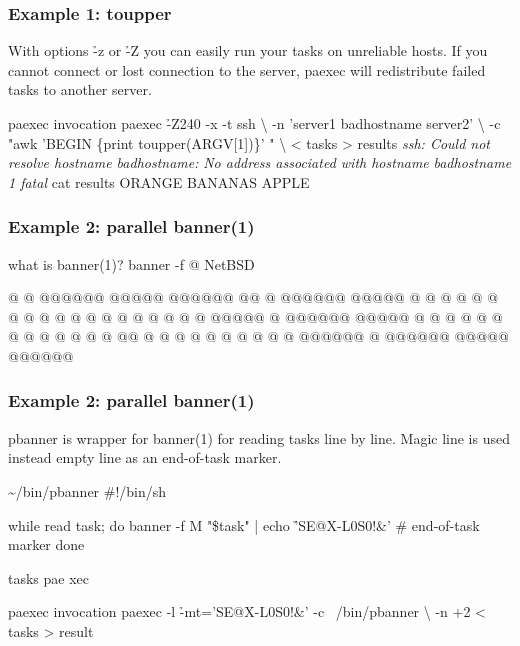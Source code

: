 \documentclass[hyperref={colorlinks=true}]{beamer}
\begin{document}
\begin{frame}[fragile]
  \frametitle{Example 1: toupper}
With options \h{-z} or \h{-Z} you can easily run your tasks on
unreliable hosts. If you cannot connect or lost connection to the
server, paexec will redistribute failed tasks to another server.
  \begin{block}{}
      \begin{CodeLarge}{paexec invocation}
\prompt{\$} paexec \h{-Z}240 -x -t ssh \textbackslash
-n 'server1 badhostname server2' \textbackslash
-c "awk 'BEGIN \{print toupper(ARGV[1])\}' " \textbackslash
    < tasks > results
{\it ssh: Could not resolve hostname badhostname:}
{\it  No address associated with hostname}
{\it  badhostname 1 fatal}
\prompt{\$} cat results
ORANGE
BANANAS
APPLE
\prompt{\$}
      \end{CodeLarge}
  \end{block}
\end{frame}


\linespread{0.5}
\begin{frame}[fragile]
  \frametitle{Example 2: parallel banner(1)}

  \begin{block}{}
      \begin{CodeLarge}{what is banner(1)?}
\prompt{\$} banner -f @ NetBSD

@     @                 @@@@@@   @@@@@  @@@@@@
@@    @  @@@@@@   @@@@@ @     @ @     @ @     @
@ @   @  @          @   @     @ @       @     @
@  @  @  @@@@@      @   @@@@@@   @@@@@  @     @
@   @ @  @          @   @     @       @ @     @
@    @@  @          @   @     @ @     @ @     @
@     @  @@@@@@     @   @@@@@@   @@@@@  @@@@@@


\prompt{\$}
      \end{CodeLarge}
  \end{block}
\end{frame}
\linespread{1}

\begin{frame}[fragile]
  \frametitle{Example 2: parallel banner(1)}
pbanner is wrapper for banner(1) for reading tasks line by line.
Magic line is used instead empty line as an end-of-task marker.
  \begin{block}{}
      \begin{Code}{\~{}/bin/pbanner}
#!/bin/sh

while read task; do
   banner -f M "\$task" |
   echo \h{'SE@X-L0S0!&'} # end-of-task marker
done
      \end{Code}
      \begin{Code}{tasks}
pae
xec
      \end{Code}

      \begin{Code}{paexec invocation}
\prompt{\$} paexec -l \h{-mt='SE@X-L0S0!&'} -c ~/bin/pbanner \textbackslash
   -n +2 < tasks > result
\prompt{\$}
      \end{Code}
  \end{block}
\end{frame}
\end{document}
